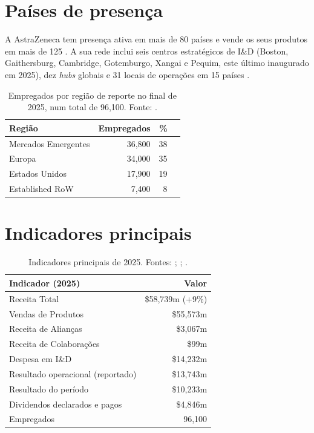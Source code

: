 \section{Países de presença}

A AstraZeneca tem presença ativa em mais de 80 países e vende os seus produtos em mais de 125 \cite[p.~32]{AR}. A sua rede inclui seis centros estratégicos de I\&D (Boston, Gaithersburg, Cambridge, Gotemburgo, Xangai e Pequim, este último inaugurado em 2025), dez \textit{hubs} globais e 31 locais de operações em 15 países \cite[p.~27]{AR}.


\begin{table}[H]\centering
\caption{Empregados por região de reporte no final de 2025, num total de 96,100. Fonte: \cite[p.~27]{AR}.}
\label{tab:empregados}
\begin{tabular}{@{}lrrB@{}}
\toprule
\textbf{Região} & \textbf{Empregados} & \textbf{\%} & \\
\midrule
Mercados Emergentes & 36,800 & 38 &  \\
Europa              & 34,000 & 35 &  \\
Estados Unidos      & 17,900 & 19 &  \\
Established RoW     &  7,400 &  8 &  \\
\bottomrule
\end{tabular}
\end{table}
\section{Indicadores principais}

\begin{table}[H]\centering
\caption{Indicadores principais de 2025. Fontes: \cite[p.~1]{AR}; \cite[p.~125]{AR}; \cite[p.~27]{AR}.}
\label{tab:indicadores}
\begin{tabular}{@{}lr@{}}
\toprule
\textbf{Indicador (2025)} & \textbf{Valor} \\
\midrule
Receita Total                      & \$58,739m (+9\%) \\
\quad Vendas de Produtos           & \$55,573m \\
\quad Receita de Alianças          & \$3,067m \\
\quad Receita de Colaborações      & \$99m \\
\addlinespace
Despesa em I\&D                    & \$14,232m \\
Resultado operacional (reportado)  & \$13,743m \\
Resultado do período               & \$10,233m \\
Dividendos declarados e pagos      & \$4,846m \\
Empregados                         & 96,100 \\
\bottomrule
\end{tabular}
\end{table}

